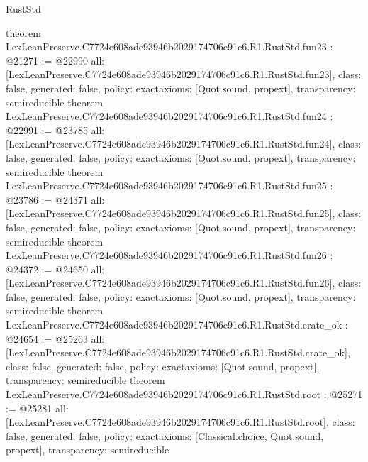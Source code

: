 \begin{lexlean}{RustStd}
\begin{coremodule}
{}
theorem LexLeanPreserve.C7724e608ade93946b2029174706c91c6.R1.RustStd.fun23 : @21271 := @22990 {
  all: [LexLeanPreserve.C7724e608ade93946b2029174706c91c6.R1.RustStd.fun23],
  class: false,
  generated: false,
  policy: exact{axioms: [Quot.sound, propext]},
  transparency: semireducible
}
theorem LexLeanPreserve.C7724e608ade93946b2029174706c91c6.R1.RustStd.fun24 : @22991 := @23785 {
  all: [LexLeanPreserve.C7724e608ade93946b2029174706c91c6.R1.RustStd.fun24],
  class: false,
  generated: false,
  policy: exact{axioms: [Quot.sound, propext]},
  transparency: semireducible
}
theorem LexLeanPreserve.C7724e608ade93946b2029174706c91c6.R1.RustStd.fun25 : @23786 := @24371 {
  all: [LexLeanPreserve.C7724e608ade93946b2029174706c91c6.R1.RustStd.fun25],
  class: false,
  generated: false,
  policy: exact{axioms: [Quot.sound, propext]},
  transparency: semireducible
}
theorem LexLeanPreserve.C7724e608ade93946b2029174706c91c6.R1.RustStd.fun26 : @24372 := @24650 {
  all: [LexLeanPreserve.C7724e608ade93946b2029174706c91c6.R1.RustStd.fun26],
  class: false,
  generated: false,
  policy: exact{axioms: [Quot.sound, propext]},
  transparency: semireducible
}
theorem LexLeanPreserve.C7724e608ade93946b2029174706c91c6.R1.RustStd.crate_ok : @24654 := @25263 {
  all: [LexLeanPreserve.C7724e608ade93946b2029174706c91c6.R1.RustStd.crate_ok],
  class: false,
  generated: false,
  policy: exact{axioms: [Quot.sound, propext]},
  transparency: semireducible
}
theorem LexLeanPreserve.C7724e608ade93946b2029174706c91c6.R1.RustStd.root : @25271 := @25281 {
  all: [LexLeanPreserve.C7724e608ade93946b2029174706c91c6.R1.RustStd.root],
  class: false,
  generated: false,
  policy: exact{axioms: [Classical.choice, Quot.sound, propext]},
  transparency: semireducible
}


\end{coremodule}
\end{lexlean}
